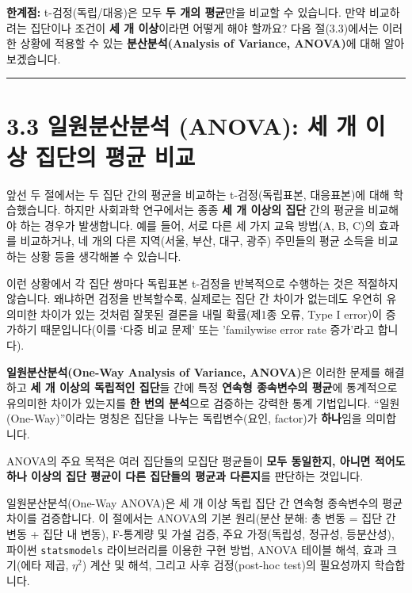 \documentclass[
  letterpaper,
]{book}
\begin{document}
\textbf{한계점:} t-검정(독립/대응)은 모두 \textbf{두 개의 평균}만을
비교할 수 있습니다. 만약 비교하려는 집단이나 조건이 \textbf{세 개
이상}이라면 어떻게 해야 할까요? 다음 절(3.3)에서는 이러한 상황에 적용할
수 있는 \textbf{분산분석(Analysis of Variance, ANOVA)}에 대해
알아보겠습니다.

\begin{center}\rule{0.5\linewidth}{0.5pt}\end{center}

\section{3.3 일원분산분석 (ANOVA): 세 개 이상 집단의 평균
비교}\label{sec-one-way-anova}

앞선 두 절에서는 두 집단 간의 평균을 비교하는 t-검정(독립표본,
대응표본)에 대해 학습했습니다. 하지만 사회과학 연구에서는 종종
\textbf{세 개 이상의 집단} 간의 평균을 비교해야 하는 경우가 발생합니다.
예를 들어, 서로 다른 세 가지 교육 방법(A, B, C)의 효과를 비교하거나, 네
개의 다른 지역(서울, 부산, 대구, 광주) 주민들의 평균 소득을 비교하는
상황 등을 생각해볼 수 있습니다.

이런 상황에서 각 집단 쌍마다 독립표본 t-검정을 반복적으로 수행하는 것은
적절하지 않습니다. 왜냐하면 검정을 반복할수록, 실제로는 집단 간 차이가
없는데도 우연히 유의미한 차이가 있는 것처럼 잘못된 결론을 내릴
확률(제1종 오류, Type I error)이 증가하기 때문입니다(이를 `다중 비교
문제' 또는 'familywise error rate 증가'라고 합니다).

\textbf{일원분산분석(One-Way Analysis of Variance, ANOVA)}은 이러한
문제를 해결하고 \textbf{세 개 이상의 독립적인 집단}들 간에 특정
\textbf{연속형 종속변수의 평균}에 통계적으로 유의미한 차이가 있는지를
\textbf{한 번의 분석}으로 검증하는 강력한 통계 기법입니다.
``일원(One-Way)''이라는 명칭은 집단을 나누는 독립변수(요인, factor)가
\textbf{하나}임을 의미합니다.

ANOVA의 주요 목적은 여러 집단들의 모집단 평균들이 \textbf{모두 동일한지,
아니면 적어도 하나 이상의 집단 평균이 다른 집단들의 평균과 다른지}를
판단하는 것입니다.

\begin{tcolorbox}[enhanced jigsaw, toprule=.15mm, opacitybacktitle=0.6, coltitle=black, colbacktitle=quarto-callout-note-color!10!white, colframe=quarto-callout-note-color-frame, left=2mm, colback=white, opacityback=0, bottomtitle=1mm, titlerule=0mm, toptitle=1mm, title=\textcolor{quarto-callout-note-color}{\faInfo}\hspace{0.5em}{📌 핵심 요약}, arc=.35mm, rightrule=.15mm, leftrule=.75mm, bottomrule=.15mm, breakable]

일원분산분석(One-Way ANOVA)은 세 개 이상 독립 집단 간 연속형 종속변수의
평균 차이를 검증합니다. 이 절에서는 ANOVA의 기본 원리(분산 분해: 총 변동
= 집단 간 변동 + 집단 내 변동), F-통계량 및 가설 검증, 주요 가정(독립성,
정규성, 등분산성), 파이썬 \texttt{statsmodels} 라이브러리를 이용한 구현
방법, ANOVA 테이블 해석, 효과 크기(에타 제곱, \(\eta^2\)) 계산 및 해석,
그리고 사후 검정(post-hoc test)의 필요성까지 학습합니다.

\end{tcolorbox}
\end{document}

